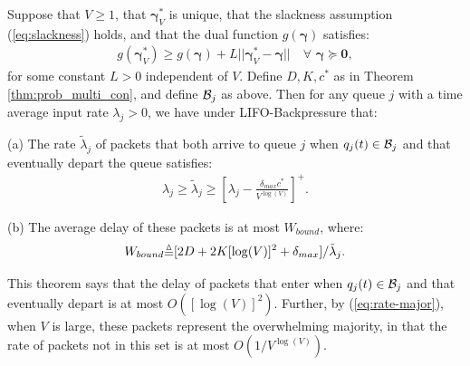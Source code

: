 \documentclass[journal]{IEEEtran}
\newcommand{\defequiv}{\mbox{\raisebox{-.3ex}{$\overset{\vartriangle}{=}$}}}
\newcommand{\bv}[1]{{\boldsymbol{#1} }}
\newcommand{\script}[1]{{{\cal{#1} }}}
\begin{document}

\begin{thm} \label{thm:qlalifo_delay}
Suppose that $V\geq1$, that 
$\bv{\gamma}_V^*$ is unique, that the slackness assumption 
(\ref{eq:slackness}) holds, and that the dual function $g(\bv{\gamma})$ satisfies: 
\begin{eqnarray}
g(\bv{\gamma}^*_V)\geq g(\bv{\gamma})+L||\bv{\gamma}^*_V-\bv{\gamma}||\quad\forall\,\,\bv{\gamma}\succeq\bv{0}\label{eq:dualpolyhedralcond2},
\end{eqnarray}
for some constant $L>0$ independent of $V$.  Define $D, K, c^*$ as in Theorem  \ref{thm:prob_multi_con}, and define $\script{B}_j$ as above. 
Then for any queue $j$ with a time average input rate $\lambda_j>0$, 
we have under LIFO-Backpressure that: 

(a) The rate $\tilde{\lambda}_j$ of packets that both arrive to queue $j$ when $q_j(t) \in\script{B}_j$ and that eventually 
depart the queue satisfies: 
\begin{eqnarray}
\lambda_j \geq \tilde{\lambda}_j \geq \left[\lambda_j - \frac{\delta_{max}c^*}{V^{\log(V)}}\right]^+. \label{eq:rate-major}
\end{eqnarray}

(b) The average delay of these packets is at most $W_{bound}$, where: 
\[ W_{bound} \defequiv [2D + 2K[\log(V)]^2+\delta_{max}]/\tilde{\lambda}_j. \]
\end{thm} 

This theorem says that the delay of packets that enter when $q_j(t) \in \script{B}_j$ and that eventually 
depart is at most $O([\log(V)]^2)$.  Further, by (\ref{eq:rate-major}), when $V$ is large, these packets represent the overwhelming majority,
 in that the rate of packets not in this set is at most $O(1/V^{\log(V)})$. 
\end{document}
